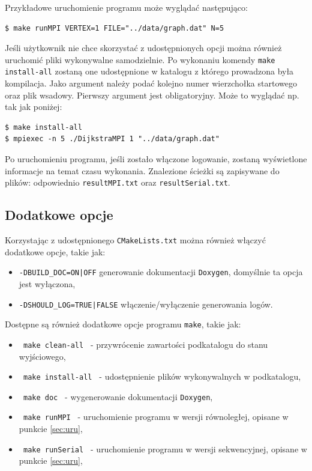 \documentclass[12pt]{article}
\begin{document}
\noindent
Przykładowe uruchomienie programu może wyglądać następująco:
\begin{lstlisting}
$ make runMPI VERTEX=1 FILE="../data/graph.dat" N=5
\end{lstlisting}

Jeśli użytkownik nie chce skorzystać z udostępnionych opcji można również uruchomić pliki wykonywalne samodzielnie. Po wykonaniu komendy \lstinline|make install-all| zostaną one udostępnione w katalogu z którego prowadzona była kompilacja. Jako argument należy podać kolejno numer wierzchołka startowego oraz plik wsadowy. Pierwszy argument jest obligatoryjny. Może to wyglądać np. tak jak poniżej:

\begin{lstlisting}
$ make install-all
$ mpiexec -n 5 ./DijkstraMPI 1 "../data/graph.dat"
\end{lstlisting}

Po uruchomieniu programu, jeśli zostało włączone logowanie, zostaną wyświetlone informacje na temat czasu wykonania. Znalezione ścieżki są zapisywane do plików: odpowiednio \lstinline|resultMPI.txt| oraz \lstinline|resultSerial.txt|.

\subsection{Dodatkowe opcje}
Korzystając z udostępnionego \lstinline|CMakeLists.txt| można również włączyć dodatkowe opcje, takie jak:
\begin{itemize}
\item \lstinline+-DBUILD_DOC=ON|OFF+ generowanie dokumentacji \lstinline|Doxygen|, domyślnie ta opcja jest wyłączona,
\item \lstinline+-DSHOULD_LOG=TRUE|FALSE+ włączenie/wyłączenie generowania logów.
\end{itemize}

\noindent
Dostępne są również dodatkowe opcje programu \lstinline|make|, takie jak:
\begin{itemize}
\item \lstinline| make clean-all | - przywrócenie zawartości podkatalogu do stanu wyjściowego,
\item \lstinline| make install-all | - udostępnienie plików wykonywalnych w podkatalogu,
\item \lstinline| make doc |  - wygenerowanie dokumentacji \lstinline|Doxygen|,
\item \lstinline| make runMPI |  - uruchomienie programu w wersji równoległej, opisane w punkcie \ref{sec:uru},
\item \lstinline| make runSerial |  - uruchomienie programu w wersji sekwencyjnej, opisane w punkcie  \ref{sec:uru},
\end{itemize}
\end{document}
